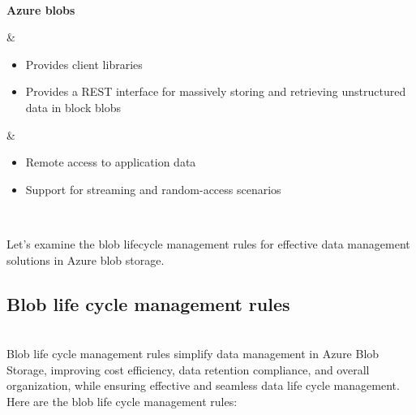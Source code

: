 \begin{center}
{\begin{longtable}[]
\begin{minipage}[t]{\linewidth}
\begin{itemize}
\end{itemize}
\end{minipage} \\
\begin{minipage}[t]{\linewidth}\raggedright
\textbf{Azure blobs}
\end{minipage} & \begin{minipage}[t]{\linewidth}\raggedright
\begin{itemize}
\item
Provides client libraries
\item
Provides a REST interface for massively storing and retrieving unstructured data in block blobs
\end{itemize}
\end{minipage} & \begin{minipage}[t]{\linewidth}\raggedright
\begin{itemize}
\item
Remote access to application data
\item
Support for streaming and random-access scenarios
\end{itemize}
\end{minipage} \\
\end{longtable}
}
\end{center}

Let's examine the blob lifecycle management rules for effective data management solutions in Azure blob storage.

\subsection{Blob life cycle management rules}\label{bFcikMju76m-r_nKWpVDv}
\\
Blob life cycle management rules simplify data management in Azure Blob Storage, improving cost efficiency, data retention compliance, and overall organization, while ensuring effective and seamless data life cycle management.
\\
Here are the blob life cycle management rules:


